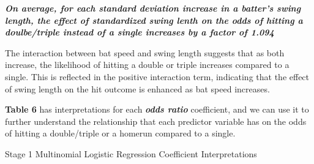 \documentclass[
  letterpaper,
  DIV=11,
  numbers=noendperiod]{scrartcl}
\begin{document}
\textbf{\emph{On average, for each standard deviation increase in a
batter's swing length, the effect of standardized swing lenth on the
odds of hitting a doulbe/triple instead of a single increases by a
factor of 1.094}}

The interaction between bat speed and swing length suggests that as both
increase, the likelihood of hitting a double or triple increases
compared to a single. This is reflected in the positive interaction
term, indicating that the effect of swing length on the hit outcome is
enhanced as bat speed increases.

\textbf{Table 6} has interpretations for each \textbf{\emph{odds ratio}}
coefficient, and we can use it to further understand the relationship
that each predictor variable has on the odds of hitting a double/triple
or a homerun compared to a single.

\newpage

\begin{table}

\caption{\label{tbl-6}Stage 1 Multinomial Logistic Regression
Coefficient Interpretations}


\end{table}%
\end{document}
